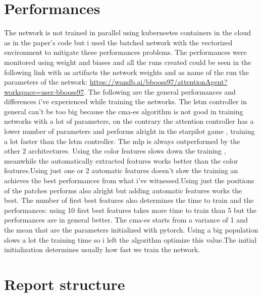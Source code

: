 \documentclass{article}
\begin{document}
\section{Performances}
The network is not trained in parallel using kuberneetes containers in the cloud as in the paper's code but i used the batched network with the vectorized environment to mitigate these performances problems.
The performances were monitored using weight and biases and all the runs created could be seen in the following link with as artifacts the network weights and as name of the run the parameters of the network: \url{https://wandb.ai/bbooss97/attentionAgent?workspace=user-bbooss97}.
The following are the general performances and differences i've experienced while training the networks.
The lstm controller in general can't be too big because the cma-es algorithm is not good in training networks with a lot of parameters, on the contrary the attention controller has a lower number of parameters and performs alright in the starpilot game , training a lot faster than the lstm controller.
The mlp is always outperformed by the other 2 architectures.
Using the color features slows down the training , meanwhile the automatically extracted features works better than the color features.Using just one or 2 automatic features doesn't slow the training an achieves the best performances from what i've witnessed.Using just the positions of the patches performs also alright but adding automatic features works the best.
The number of first best features also determines the time to train and the performances: using 10 first best features takes more time to train than 5 but the performances are in general better.
The cma-es starts from a variance of 1 and the mean that are the parameters initialized with pytorch.
Using a big population slows a lot the training time so i left the algorithm optimize this value.The initial initialization determines usually how fast we train the network.




















\section{Report structure}
\end{document}
